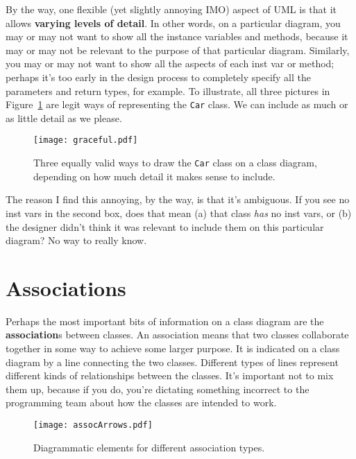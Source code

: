 By the way, one flexible (yet slightly annoying IMO) aspect of UML is that it
allows \textbf{varying levels of detail}. In other words, on a particular
diagram, you may or may not want to show all the instance variables and
methods, because it may or may not be relevant to the purpose of that
particular diagram. Similarly, you may or may not want to show all the aspects
of each inst var or method; perhaps it's too early in the design process to
completely specify all the parameters and return types, for example. To
illustrate, all three pictures in Figure~\ref{fig:graceful} are legit
ways of representing the \texttt{Car} class. We can include as much or as
little detail as we please.

\begin{figure}[ht]
\centering
\texttt{[image: graceful.pdf]}   %
\caption{Three equally valid ways to draw the \texttt{Car} class on a class
diagram, depending on how much detail it makes sense to include.}
\label{fig:graceful}
\end{figure}

The reason I find this annoying, by the way, is that it's ambiguous. If you
see no inst vars in the second box, does that mean (a) that class \textit{has}
no inst vars, or (b) the designer didn't think it was relevant to include them
on this particular diagram? No way to really know.

\section{Associations}

Perhaps the most important bits of information on a class diagram are the
\textbf{association}s between classes. An association means that two classes
collaborate together in some way to achieve some larger purpose. It is
indicated on a class diagram by a line connecting the two classes. Different
types of lines represent different kinds of relationships between the classes.
It's important not to mix them up, because if you do, you're dictating
something incorrect to the programming team about how the classes are intended
to work.

\begin{figure}[ht]
\centering
\texttt{[image: assocArrows.pdf]}   %
\vspace{.2in}
\caption{Diagrammatic elements for different association types.}
\label{fig:assocArrows}
\end{figure}

